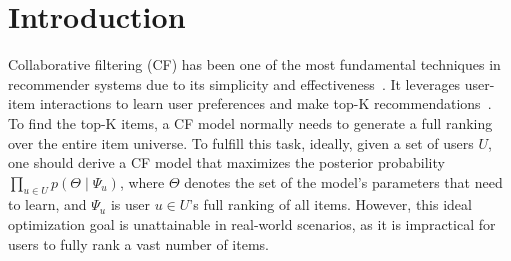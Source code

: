 \section{Introduction}
Collaborative filtering (CF) has been one of the most fundamental techniques in recommender systems due to its simplicity and effectiveness~\cite{MZW21}. It leverages user-item interactions to learn user preferences and make top-K recommendations~\cite{HLZ17,WHW19,HDW20}. To find the top-K items, a CF model normally needs to generate a full ranking over the entire item universe. To fulfill this task, ideally, given a set of users $U$, one should derive a CF model that maximizes the posterior probability $\prod_ {u \in U}p(\Theta \mid \Psi_u)$, where $\Theta$ denotes the set of the model's parameters that need to learn, and $\Psi_u$ is user $u \in U$'s full ranking of all items. However, this ideal optimization goal is unattainable in real-world scenarios, as it is impractical for users to fully rank a vast number of items.

